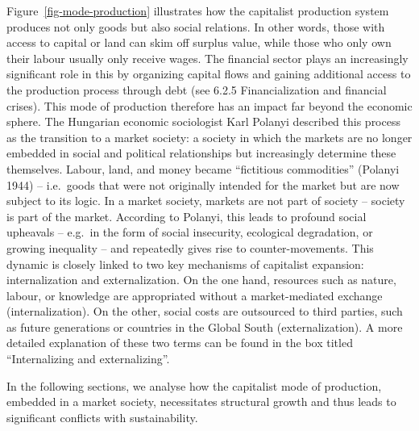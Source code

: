 \documentclass[
  a4paper,
  openany]{book}
\begin{document}
Figure~\ref{fig-mode-production} illustrates how the capitalist
production system produces not only goods but also social relations. In
other words, those with access to capital or land can skim off surplus
value, while those who only own their labour usually only receive wages.
The financial sector plays an increasingly significant role in this by
organizing capital flows and gaining additional access to the production
process through debt (see 6.2.5 Financialization and financial crises).
This mode of production therefore has an impact far beyond the economic
sphere. The Hungarian economic sociologist Karl Polanyi described this
process as the transition to a market society: a society in which the
markets are no longer embedded in social and political relationships but
increasingly determine these themselves. Labour, land, and money became
``fictitious commodities'' (Polanyi 1944) -- i.e.~goods that were not
originally intended for the market but are now subject to its logic. In
a market society, markets are not part of society -- society is part of
the market. According to Polanyi, this leads to profound social
upheavals -- e.g.~in the form of social insecurity, ecological
degradation, or growing inequality -- and repeatedly gives rise to
counter-movements. This dynamic is closely linked to two key mechanisms
of capitalist expansion: internalization and externalization. On the one
hand, resources such as nature, labour, or knowledge are appropriated
without a market-mediated exchange (internalization). On the other,
social costs are outsourced to third parties, such as future generations
or countries in the Global South (externalization). A more detailed
explanation of these two terms can be found in the box titled
``Internalizing and externalizing''.

In the following sections, we analyse how the capitalist mode of
production, embedded in a market society, necessitates structural growth
and thus leads to significant conflicts with sustainability.
\end{document}
